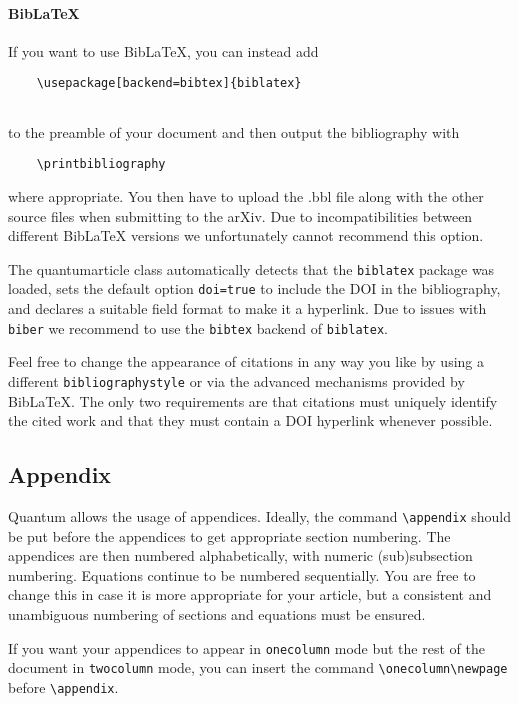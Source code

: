 \documentclass[a4paper,noarxiv,onecolumn]{quantumarticle}
\begin{document}
	\paragraph{BibLaTeX}
	If you want to use BibLaTeX, you can instead add
	\begin{verbatim}
	\usepackage[backend=bibtex]{biblatex}
	
	\end{verbatim}
	to the preamble of your document and then output the bibliography with
	\begin{verbatim}
	\printbibliography
	\end{verbatim}
	where appropriate.
	You then have to upload the .bbl file along with the other source files when submitting to the arXiv.
	Due to incompatibilities between different BibLaTeX versions we unfortunately cannot recommend this option.
	
	The quantumarticle class automatically detects that the \texttt{biblatex} package was loaded, sets the default option \texttt{doi=true} to include the DOI in the bibliography, and declares a suitable field format to make it a hyperlink.
	Due to issues with \texttt{biber} we recommend to use the \texttt{bibtex} backend of \texttt{biblatex}.
	
	Feel free to change the appearance of citations in any way you like by using a different \texttt{bibliographystyle} or via the advanced mechanisms provided by BibLaTeX.
	The only two requirements are that citations must uniquely identify the cited work and that they must contain a DOI hyperlink whenever possible.
	
	\subsection{Appendix}
	Quantum allows the usage of appendices. Ideally, the command \texttt{\textbackslash{}appendix} should be put before the appendices to get appropriate section numbering. The appendices are then numbered alphabetically, with numeric (sub)subsection numbering.
	Equations continue to be numbered sequentially.
	You are free to change this in case it is more appropriate for your article, but a consistent and unambiguous numbering of sections and equations must be ensured.
	
	If you want your appendices to appear in \texttt{onecolumn} mode but the rest of the document in \texttt{twocolumn} mode, you can insert the command \texttt{\textbackslash{}onecolumn\textbackslash{}newpage} before \texttt{\textbackslash{}appendix}.   
	
\end{document}
